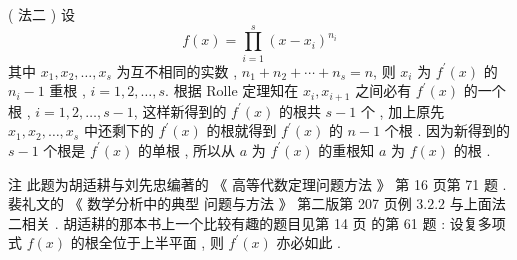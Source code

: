 \documentclass[10pt]{article}
\begin{document}
( 法二 )  设 
$$
f(x)=\prod_{i=1}^{s}\left(x-x_{i}\right)^{n_{i}}
$$
 其中  $x_{1}, x_{2}, \ldots, x_{s}$  为互不相同的实数 , $n_{1}+n_{2}+\cdots+n_{s}=n$,  则  $x_{i}$  为  $f^{\prime}(x)$  的  $n_{i}-1$  重根 , $i=1,2, \ldots, s$.  根据  Rolle  定理知在  $x_{i}, x_{i+1}$  之间必有  $f^{\prime}(x)$  的一个根 , $i=1,2, \ldots, s-1$,  这样新得到的  $f^{\prime}(x)$  的根共  $s-1$  个 ,  加上原先  $x_{1}, x_{2}, \ldots, x_{s}$  中还剩下的  $f^{\prime}(x)$  的根就得到  $f^{\prime}(x)$  的  $n-1$  个根 .  因为新得到的  $s-1$  个根是  $f^{\prime}(x)$  的单根 ,  所以从  $a$  为  $f^{\prime}(x)$  的重根知  $a$  为  $f(x)$  的根 .

 注   此题为胡适耕与刘先忠编著的 《 高等代数定理问题方法 》 第  16  页第  71  题 .  裴礼文的 《 数学分析中的典型   问题与方法 》 第二版第  207  页例  $3.2 .2$  与上面法二相关 .  胡适耕的那本书上一个比较有趣的题目见第  14  页   的第  61  题 :  设复多项式  $f(x)$  的根全位于上半平面 ,  则  $f^{\prime}(x)$  亦必如此 .
\end{document}
